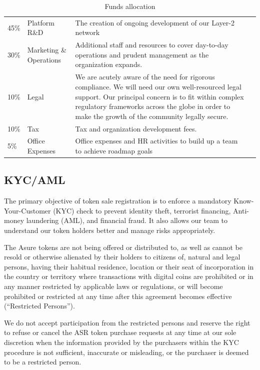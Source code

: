 \begin{table}[H]
\begin{tabular}{llp{}l}
  45\% & Platform R\&D & The creation of ongoing development of our Layer-2 network \\
  30\% & Marketing \& Operations & Additional staff and resources to cover day-to-day operations and prudent management as the organization expands. \\
  10\% & Legal & We are acutely aware of the need for rigorous compliance. We will need our own well-resourced legal support. Our principal concern is to fit within complex regulatory frameworks across the globe in order to make the growth of the community legally secure. \\
  10\% & Tax & Tax and organization development fees.\\
  5\% & Office Expenses & Office expenses and HR activities to build up
        a team to achieve roadmap goals
\end{tabular}
\caption{\label{tab:table-name}Funds allocation}
\end{table}

\subsection{KYC/AML}

The primary objective of token sale registration is to enforce a mandatory Know-Your-Customer (KYC) check to prevent identity theft, terrorist financing, Anti-money laundering (AML), and financial fraud. It also allows our team to understand our token holders better and manage risks appropriately.

The Asure tokens are not being offered or distributed to, as well as cannot be resold or otherwise alienated by their holders to citizens of, natural and legal persons, having their habitual residence, location or their seat of incorporation in the country or territory where transactions with digital coins are prohibited or in any manner restricted by applicable laws or regulations, or will become prohibited or restricted at any time after this agreement becomes effective (“Restricted Persons”).

We do not accept participation from the restricted persons and reserve the right to refuse or cancel the ASR token purchase requests at any time at our sole discretion when the information provided by the purchasers within the KYC procedure is not sufficient, inaccurate or misleading, or the purchaser is deemed to be a restricted person.

